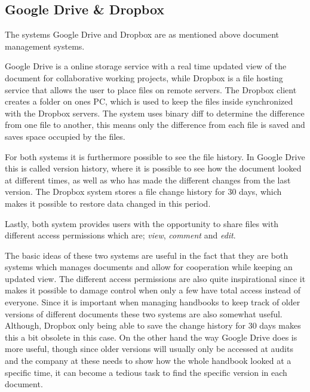 \subsection{Google Drive \& Dropbox}\label{sec:DropDrive}
The systems Google Drive and Dropbox are as mentioned above document management systems.

Google Drive is a online storage service with a real time updated view of the document for collaborative working projects, while Dropbox is a file hosting service that allows the user to place files on remote servers.
The Dropbox client creates a folder on ones PC, which is used to keep the files inside synchronized with the Dropbox servers. 
The system uses binary diff to determine the difference from one file to another, this means only the difference from each file is saved and saves space occupied by the files\cite{DropboxDiff}.

For both systems it is furthermore possible to see the file history.
In Google Drive this is called version history, where it is possible to see how the document looked at different times, as well as who has made the different changes from the last version.
The Dropbox system stores a file change history for 30 days, which makes it possible to restore data changed in this period.

Lastly, both system provides users with the opportunity to share files with different access permissions which are; \textit{view}, \textit{comment} and \textit{edit}.

The basic ideas of these two systems are useful in the fact that they are both systems which manages documents and allow for cooperation while keeping an updated view.
The different access permissions are also quite inspirational since it makes it possible to damage control when only a few have total access instead of everyone.
Since it is important when managing handbooks to keep track of older versions of different documents these two systems are also somewhat useful.
Although, Dropbox only being able to save the change history for 30 days makes this a bit obsolete in this case.
On the other hand the way Google Drive does is more useful, though since older versions will usually only be accessed at audits and the company at these needs to show how the whole handbook looked at a specific time, it can become a tedious task to find the specific version in each document.

